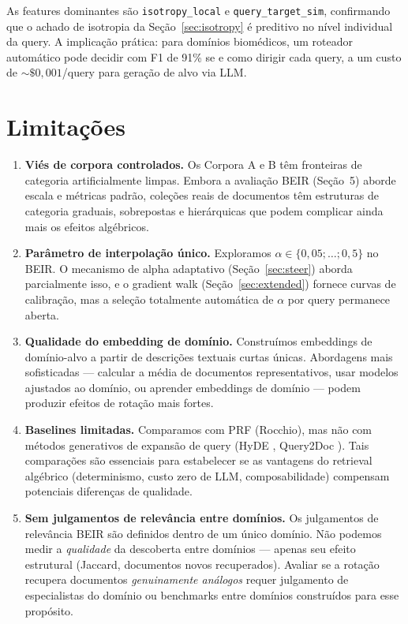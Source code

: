 \documentclass{article}
\begin{document}
\noindent As features dominantes são \texttt{isotropy\_local} e \texttt{query\_target\_sim}, confirmando que o achado de isotropia da Seção~\ref{sec:isotropy} é preditivo no nível individual da query. A implicação prática: para domínios biomédicos, um roteador automático pode decidir com F1 de 91\% se e como dirigir cada query, a um custo de ${\sim}\$0{,}001$/query para geração de alvo via LLM.

\section{Limitações}

\begin{enumerate}
\item \textbf{Viés de corpora controlados.} Os Corpora A e B têm fronteiras de categoria artificialmente limpas. Embora a avaliação BEIR (Seção~5) aborde escala e métricas padrão, coleções reais de documentos têm estruturas de categoria graduais, sobrepostas e hierárquicas que podem complicar ainda mais os efeitos algébricos.

\item \textbf{Parâmetro de interpolação único.} Exploramos $\alpha \in \{0{,}05; \ldots; 0{,}5\}$ no BEIR. O mecanismo de alpha adaptativo (Seção~\ref{sec:steer}) aborda parcialmente isso, e o gradient walk (Seção~\ref{sec:extended}) fornece curvas de calibração, mas a seleção totalmente automática de $\alpha$ por query permanece aberta.

\item \textbf{Qualidade do embedding de domínio.} Construímos embeddings de domínio-alvo a partir de descrições textuais curtas únicas. Abordagens mais sofisticadas --- calcular a média de documentos representativos, usar modelos ajustados ao domínio, ou aprender embeddings de domínio --- podem produzir efeitos de rotação mais fortes.

\item \textbf{Baselines limitadas.} Comparamos com PRF (Rocchio), mas não com métodos generativos de expansão de query (HyDE \cite{gao2023hyde}, Query2Doc \cite{wang2023query2doc}). Tais comparações são essenciais para estabelecer se as vantagens do retrieval algébrico (determinismo, custo zero de LLM, composabilidade) compensam potenciais diferenças de qualidade.

\item \textbf{Sem julgamentos de relevância entre domínios.} Os julgamentos de relevância BEIR são definidos dentro de um único domínio. Não podemos medir a \emph{qualidade} da descoberta entre domínios --- apenas seu efeito estrutural (Jaccard, documentos novos recuperados). Avaliar se a rotação recupera documentos \emph{genuinamente análogos} requer julgamento de especialistas do domínio ou benchmarks entre domínios construídos para esse propósito.
\end{enumerate}
\end{document}
